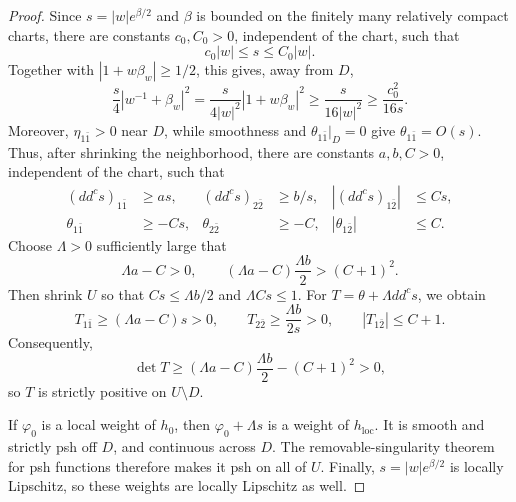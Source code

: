 \documentclass[11pt]{amsart}
\theoremstyle{definition}
\theoremstyle{remark}
\numberwithin{equation}{section}
\newcommand{\ddc}{dd^c}
\begin{document}
\begin{proof}
Since $s=|w|e^{\beta/2}$ and $\beta$ is bounded on the finitely
many relatively compact charts, there are constants $c_0,C_0>0$,
independent of the chart, such that
\[
 c_0|w|\le s\le C_0|w|.
\]
Together with $|1+w\beta_w|\ge1/2$, this gives, away from $D$,
\[
 \frac{s}{4}|w^{-1}+\beta_w|^2
 =\frac{s}{4|w|^2}|1+w\beta_w|^2
 \ge\frac{s}{16|w|^2}
 \ge\frac{c_0^2}{16s}.
\] Moreover,
$\eta_{1\bar1}>0$ near $D$, while smoothness and
$\theta_{1\bar1}|_D=0$ give $\theta_{1\bar1}=O(s)$.
Thus, after shrinking the neighborhood, there are constants
$a,b,C>0$, independent of the chart, such that
\begin{equation}\label{eq:cusp-estimates}
 \begin{aligned}
 (\ddc s)_{1\bar1}&\ge as,&
 (\ddc s)_{2\bar2}&\ge b/s,&
 |(\ddc s)_{1\bar2}|&\le Cs,\\
 \theta_{1\bar1}&\ge-Cs,&
 \theta_{2\bar2}&\ge-C,&
 |\theta_{1\bar2}|&\le C.
 \end{aligned}
\end{equation}
Choose $\Lambda>0$ sufficiently large that
\begin{equation}\label{eq:cusp-coefficient}
 \Lambda a-C>0,\qquad
 (\Lambda a-C)\frac{\Lambda b}{2}>(C+1)^2.
\end{equation}
Then shrink $U$ so that $Cs\le\Lambda b/2$ and
$\Lambda Cs\le1$. For $T=\theta+\Lambda\ddc s$, we obtain
\[
 T_{1\bar1}\ge(\Lambda a-C)s>0,\qquad
 T_{2\bar2}\ge\frac{\Lambda b}{2s}>0,\qquad
 |T_{1\bar2}|\le C+1.
\]
Consequently,
\[
 \det T\ge
 (\Lambda a-C)\frac{\Lambda b}{2}-(C+1)^2>0,
\]
so $T$ is strictly positive on $U\setminus D$.

If $\varphi_0$ is a local weight of $h_0$, then
$\varphi_0+\Lambda s$ is a weight of $h_{\mathrm{loc}}$.
It is smooth and strictly psh off $D$, and continuous
across $D$. The removable-singularity theorem for psh
functions therefore makes it psh on all of $U$.
Finally, $s=|w|e^{\beta/2}$ is locally Lipschitz, so these
weights are locally Lipschitz as well.
\end{proof}
\end{document}
